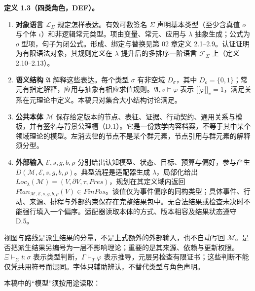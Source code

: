 \documentclass[UTF8,a4paper,zihao=-4,fontset=windows,openany]{ctexbook}
\def\operatorname#1{#1}%
\def\mathrm#1{#1}%
\providecommand{\llbracket}{\mathopen{[\![}}
\providecommand{\rrbracket}{\mathclose{]\!]}}
\begin{document}
\textbf{定义 1.3（四类角色，DEF）。}

\begin{enumerate}
\item \textbf{对象语言} \(\mathcal L_\Sigma\) 规定怎样表达。有效可数签名 \(\Sigma\) 声明基本类型（至少含真值 \(o\) 与个体 \(\iota\)）和非逻辑常元类型。项由变量、常元、应用与 \(\lambda\) 抽象生成；公式为 \(o\) 型项，句子为闭公式。形成、绑定与替换见第 02 章定义 2.1–2.9。认证证明为有限语法对象，其规则定义在 \(\lambda\) 提升后的多排序一阶语言 \(\mathcal F_\Sigma\) 上（定义 2.10–2.13）。
\item \textbf{语义结构} \(\mathfrak A\) 解释这些表达。每个类型 \(\sigma\) 有非空域 \(D_\sigma\)，其中 \(D_o=\{0,1\}\)；常元有指定解释，应用与抽象有相应求值规则。\(\mathfrak A,v\models\varphi\) 表示 \(\llbracket\varphi\rrbracket_v=1\)，满足关系在元理论中定义。本稿只对集合大小结构讨论满足。
\item \textbf{公共本体} \(\mathcal M\) 保存给定版本的节点、表征、证据、行动契约、通用关系与模板，并有签名与背景公理槽（D.1）。它是一份数学内容档案，不等于其中某个领域理论的模型。左消去律的节点不是某个群元素，节点引用与群元素的解释须分型。
\item \textbf{外部输入} \(\mathcal E,s,g,b,\rho\) 分别给出认知模型、状态、目标、预算与偏好，参与产生 \(D(\mathcal M,\mathcal E,s,g,b,\rho)\)。典型流程是适配器生成 \(\lambda\)，局部化给出 \(\operatorname{Loc}_\lambda(\mathcal M)=(V,\partial V,\tau,Pres)\)，规划在其定义域内返回 \(\operatorname{Plan}_{\mathcal M,\mathcal E,s,g,b,\rho}(V)\in\mathrm{FinPos}\)。该值仅为事件偏序的同构类型；具体事件、行动、来源、排程与外部约束保存在完整结果包中。无合法结果或检查未决时不能强行填入一个偏序。适配器读取本体的方式、版本相容及结果状态遵守 D.5。
\end{enumerate}
视图与路线是派生结果的分量，不是上式额外的外部输入，也不自动写回 \(\mathcal M\)。是否把派生结果另编号为一层不影响理论；重要的是其来源、依赖与更新权限。\(\Xi\vdash_\Sigma t:\sigma\) 表示类型判断，\(\Gamma\vdash_T\varphi\) 表示推导，元层另检查有限证书；这些判断不能仅凭共用符号而混同。字体只辅助辨认，不替代类型与角色声明。

本稿中的“模型”须按用途读取：
\end{document}
